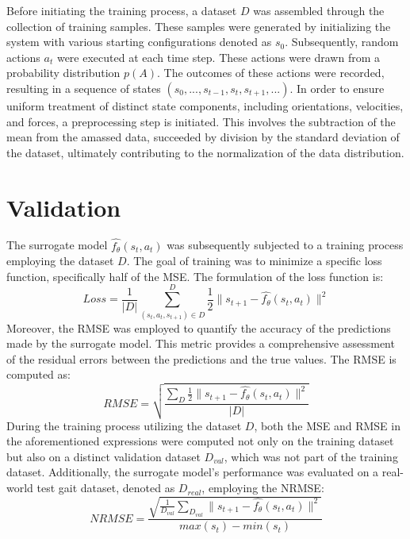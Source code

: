Before initiating the training process, a dataset $D$ was assembled through the collection of training samples. These samples were generated by initializing the system with various starting configurations denoted as $s_0$. Subsequently, random actions $a_t$ were executed at each time step. These actions were drawn from a probability distribution $p(A)$. The outcomes of these actions were recorded, resulting in a sequence of states $(s_0, ..., s_{t-1}, s_t, s_{t+1}, ...)$. In order to ensure uniform treatment of distinct state components, including orientations, velocities, and forces, a preprocessing step is initiated. This involves the subtraction of the mean from the amassed data, succeeded by division by the standard deviation of the dataset, ultimately contributing to the normalization of the data distribution.

\section{Validation}
The surrogate model $\hat{f_\theta}(s_t, a_t)$ was subsequently subjected to a training process employing the dataset $D$. The goal of training was to minimize a specific loss function, specifically half of the \ac{MSE}. The formulation of the loss function is: 
\begin{equation}
    Loss = \frac{1}{|D|}\sum_{(s_t,a_t, s_{t+1}) \in D}^{D} \frac{1}{2}\lVert s_{t+1}-\hat{f_\theta}(s_t, a_t)\rVert^2
\label{eq:loss}
\end{equation} 
Moreover, the \ac{RMSE} was employed to quantify the accuracy of the predictions made by the surrogate model. This metric provides a comprehensive assessment of the residual errors between the predictions and the true values. The \ac{RMSE} is computed as: 
\begin{equation}
    RMSE = \sqrt{\frac{\sum_{D} \frac{1}{2}\lVert s_{t+1}-\hat{f_\theta}(s_t, a_t)\rVert^2}{|D|}}
    \label{eq:RMSE}
\end{equation}
During the training process utilizing the dataset $D$, both the \ac{MSE} and \ac{RMSE} in the aforementioned expressions were computed not only on the training dataset but also on a distinct validation dataset $D_{val}$, which was not part of the training dataset. Additionally, the surrogate model's performance was evaluated on a real-world test gait dataset, denoted as $D_{real}$, employing the \ac{NRMSE}:
\begin{equation}
    NRMSE = \frac{\sqrt{\frac{1}{D_{val}}\sum_{D_{val}}\lVert s_{t+1}-\hat{f_\theta}(s_t, a_t)\rVert^2}}{max(s_t) - min(s_t)}
    \label{eq:NRMSE}
\end{equation}

